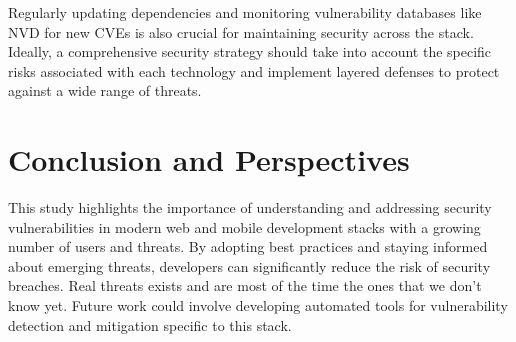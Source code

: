 \documentclass[conference]{IEEEtran}
\begin{document}
Regularly updating dependencies and monitoring vulnerability databases like NVD for new CVEs is also crucial for maintaining security across the stack.
Ideally, a comprehensive security strategy should take into account the specific risks associated with each technology and implement layered defenses to protect against a wide range of threats.

\section{Conclusion and Perspectives}
This study highlights the importance of understanding and addressing security vulnerabilities in modern web and mobile development stacks with a growing number of users and threats. By adopting best practices and staying informed about emerging threats, developers can significantly reduce the risk of security breaches. Real threats exists and are most of the time the ones that we don't know yet. Future work could involve developing automated tools for vulnerability detection and mitigation specific to this stack.
\end{document}
